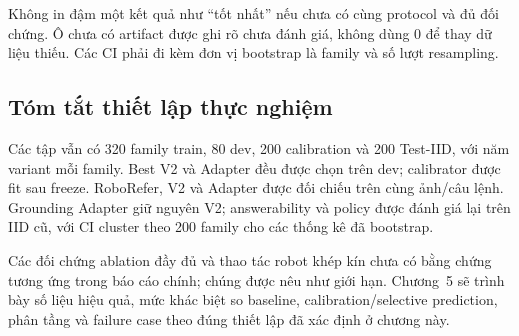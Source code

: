 Không in đậm một kết quả như “tốt nhất” nếu chưa
có cùng protocol và đủ đối chứng. Ô chưa có
artifact được ghi rõ chưa đánh giá, không dùng
0 để thay dữ liệu thiếu. Các CI phải đi kèm
đơn vị bootstrap là family và số lượt resampling.

\subsection{Tóm tắt thiết lập thực nghiệm}

Các tập vẫn có 320 family train, 80 dev, 200 calibration và 200 Test-IID, với năm variant mỗi family. Best V2 và Adapter đều được chọn trên dev; calibrator được fit sau freeze. RoboRefer, V2 và Adapter được đối chiếu trên cùng ảnh/câu lệnh. Grounding Adapter giữ nguyên V2; answerability và policy được đánh giá lại trên IID cũ, với CI cluster theo 200 family cho các thống kê đã bootstrap.

Các đối chứng ablation đầy đủ và thao tác robot
khép kín chưa có bằng chứng tương ứng trong
báo cáo chính; chúng được nêu như giới hạn.
Chương~5 sẽ trình bày số liệu hiệu quả, mức
khác biệt so baseline, calibration/selective
prediction, phân tầng và failure case theo
đúng thiết lập đã xác định ở chương này.
